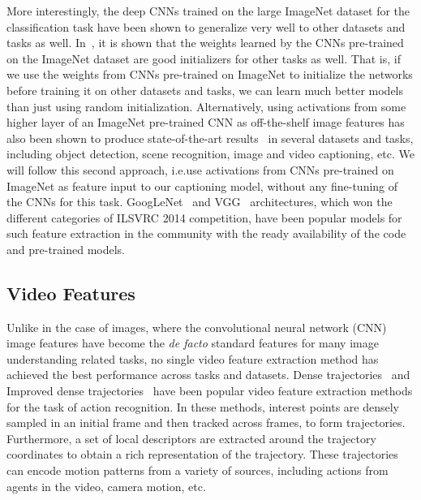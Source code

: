 More interestingly, the deep CNNs trained on the large ImageNet dataset for
the classification task have been shown to generalize very well to other
datasets and tasks as well.
In~\cite{yosinski2014transferable}, it is shown that the weights learned by the
CNNs pre-trained on the ImageNet dataset are good initializers for other tasks
as well.
That is, if we use the weights from CNNs pre-trained on ImageNet to initialize
the networks before training it on other datasets and tasks, we can learn much
better models than just using random initialization. 
Alternatively, using activations from some higher layer of an ImageNet
pre-trained CNN as off-the-shelf image features has also been shown to produce
state-of-the-art results~\cite{Donahue2014, Razavian2014CVPR, ShettyACMMM2016,
ShettyACMMM2016Wrk} in several datasets and tasks, including object detection,
scene recognition, image and video captioning, etc.
We will follow this second approach, i.e.\@ use activations from CNNs
pre-trained on ImageNet as feature input to our captioning model, without any
fine-tuning of the CNNs for this task.
GoogLeNet~\cite{DBLP:journals/corr/SzegedyLJSRAEVR14} and VGG~\cite{Simonyan14c}
architectures, which won the different categories of ILSVRC 2014 competition,
have been popular models for such feature extraction in the community with the
ready availability of the code and pre-trained models.

\subsection{Video Features}
Unlike in the case of images, where the convolutional neural network (CNN) image
features have become the \emph{de facto} standard features for many image
understanding related tasks, no single video feature extraction method has
achieved the best performance across tasks and datasets.
Dense trajectories~\cite{DBLP:conf/cvpr/WangKSL11} and Improved dense
trajectories~\cite{Wang2013} have been popular video feature extraction methods
for the task of action recognition.
In these methods, interest points are densely sampled in an initial frame
and then tracked across frames, to form trajectories.
Furthermore, a set of local descriptors are extracted around the trajectory
coordinates to obtain a rich representation of the trajectory.
These trajectories can encode motion patterns from a variety of sources, including
actions from agents in the video, camera motion, etc.

